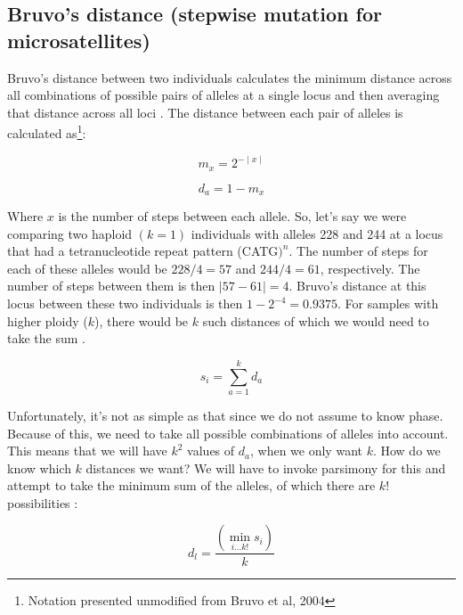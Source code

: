 \documentclass[letterpaper]{article}\usepackage[]{graphicx}\usepackage[]{color}
\begin{document}
\subsection{Bruvo's distance (stepwise mutation for microsatellites)}
\label{bruvo}

Bruvo's distance between two individuals calculates the minimum distance across
all combinations of possible pairs of alleles at a single locus and then
averaging that distance across all loci \cite{Bruvo:2004}. The distance between
each pair of alleles is calculated as\footnote{Notation presented unmodified
from Bruvo et al, 2004}\cite{Bruvo:2004}:

\begin{equation}
\label{eq:m_x}
m_x = 2^{-\mid x \mid}
\end{equation}

\begin{equation}
\label{eq:d_a}
d_a = 1 - m_x
\end{equation}

Where $x$ is the number of steps between each allele. So, let's say we were
comparing two haploid $(k = 1)$ individuals with alleles 228 and 244 at a locus
that had a tetranucleotide repeat pattern (CATG$)^n$. The number of steps for
each of these alleles would be $228/4 = 57$ and $244/4 =61$, respectively. The
number of steps between them is then $\mid 57 - 61 \mid = 4$. Bruvo's distance
at this locus between these two individuals is then $1-2^{-4} = 0.9375$. For
samples with higher ploidy ($k$), there would be $k$ such distances of which we
would need to take the sum \cite{Bruvo:2004}.

\begin{equation}
\label{eq:s_i}
s_i = \displaystyle \sum_{a=1}^{k} d_a
\end{equation}

Unfortunately, it's not as simple as that since we do not assume to know phase.
Because of this, we need to take all possible combinations of alleles into
account. This means that we will have $k^2$ values of $d_a$, when we only want
$k$. How do we know which $k$ distances we want? We will have to invoke
parsimony for this and attempt to take the minimum sum of the alleles, of which
there are $k!$ possibilities \cite{Bruvo:2004}:

\begin{equation}
\label{eq:d_l}
d_l = \frac{\left(\displaystyle \min_{i \dotsc k!} s_i\right)}{k}
\end{equation}
\end{document}
